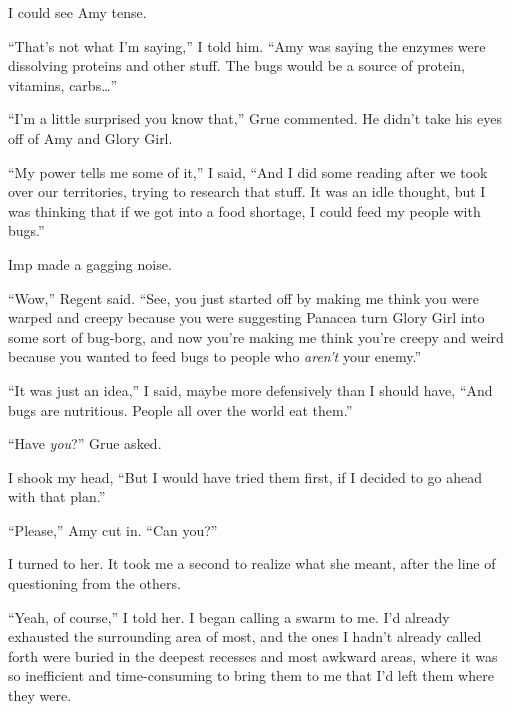 I could see Amy tense.



``That's not what I'm saying,'' I told him.  ``Amy was saying the enzymes were dissolving proteins and other stuff.  The bugs would be a source of protein, vitamins, carbs\ldots''



``I'm a little surprised you know that,'' Grue commented.  He didn't take his eyes off of Amy and Glory Girl.



``My power tells me some of it,'' I said, ``And I did some reading after we took over our territories, trying to research that stuff.  It was an idle thought, but I was thinking that if we got into a food shortage, I could feed my people with bugs.''



Imp made a gagging noise.



``Wow,'' Regent said.  ``See, you just started off by making me think you were warped and creepy because you were suggesting Panacea turn Glory Girl into some sort of bug-borg, and now you're making me think you're creepy and weird because you wanted to feed bugs to people who \emph{aren't} your enemy.''



``It was just an idea,'' I said, maybe more defensively than I should have, ``And bugs are nutritious.  People all over the world eat them.''



``Have \emph{you}?'' Grue asked.



I shook my head, ``But I would have tried them first, if I decided to go ahead with that plan.''



``Please,'' Amy cut in.  ``Can you?''



I turned to her.  It took me a second to realize what she meant, after the line of questioning from the others.



``Yeah, of course,'' I told her.  I began calling a swarm to me.  I'd already exhausted the surrounding area of most, and the ones I hadn't already called forth were buried in the deepest recesses and most awkward areas, where it was so inefficient and time-consuming to bring them to me that I'd left them where they were.



